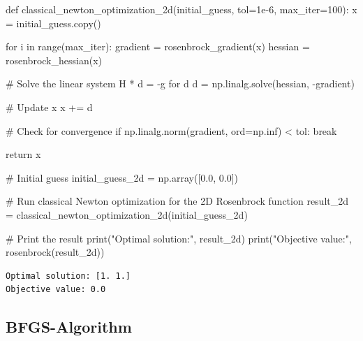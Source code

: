 \documentclass[
  letterpaper,
  DIV=11,
  numbers=noendperiod]{scrreprt}
\newenvironment{Shaded}{\begin{snugshade}}{\end{snugshade}}
\newcommand{\BuiltInTok}[1]{\textcolor[rgb]{0.00,0.23,0.31}{#1}}
\newcommand{\CommentTok}[1]{\textcolor[rgb]{0.37,0.37,0.37}{#1}}
\newcommand{\ControlFlowTok}[1]{\textcolor[rgb]{0.00,0.23,0.31}{#1}}
\newcommand{\DecValTok}[1]{\textcolor[rgb]{0.68,0.00,0.00}{#1}}
\newcommand{\FloatTok}[1]{\textcolor[rgb]{0.68,0.00,0.00}{#1}}
\newcommand{\KeywordTok}[1]{\textcolor[rgb]{0.00,0.23,0.31}{#1}}
\newcommand{\NormalTok}[1]{\textcolor[rgb]{0.00,0.23,0.31}{#1}}
\newcommand{\OperatorTok}[1]{\textcolor[rgb]{0.37,0.37,0.37}{#1}}
\newcommand{\StringTok}[1]{\textcolor[rgb]{0.13,0.47,0.30}{#1}}
\begin{document}
\begin{tcolorbox}
\begin{Shaded}
\begin{Highlighting}[]
\KeywordTok{def}\NormalTok{ classical\_newton\_optimization\_2d(initial\_guess, tol}\OperatorTok{=}\FloatTok{1e{-}6}\NormalTok{, max\_iter}\OperatorTok{=}\DecValTok{100}\NormalTok{):}
\NormalTok{    x }\OperatorTok{=}\NormalTok{ initial\_guess.copy()}

    \ControlFlowTok{for}\NormalTok{ i }\KeywordTok{in} \BuiltInTok{range}\NormalTok{(max\_iter):}
\NormalTok{        gradient }\OperatorTok{=}\NormalTok{ rosenbrock\_gradient(x)}
\NormalTok{        hessian }\OperatorTok{=}\NormalTok{ rosenbrock\_hessian(x)}

        \CommentTok{\# Solve the linear system H * d = {-}g for d}
\NormalTok{        d }\OperatorTok{=}\NormalTok{ np.linalg.solve(hessian, }\OperatorTok{{-}}\NormalTok{gradient)}

        \CommentTok{\# Update x}
\NormalTok{        x }\OperatorTok{+=}\NormalTok{ d}

        \CommentTok{\# Check for convergence}
        \ControlFlowTok{if}\NormalTok{ np.linalg.norm(gradient, }\BuiltInTok{ord}\OperatorTok{=}\NormalTok{np.inf) }\OperatorTok{\textless{}}\NormalTok{ tol:}
            \ControlFlowTok{break}

    \ControlFlowTok{return}\NormalTok{ x}

\CommentTok{\# Initial guess}
\NormalTok{initial\_guess\_2d }\OperatorTok{=}\NormalTok{ np.array([}\FloatTok{0.0}\NormalTok{, }\FloatTok{0.0}\NormalTok{])}

\CommentTok{\# Run classical Newton optimization for the 2D Rosenbrock function}
\NormalTok{result\_2d }\OperatorTok{=}\NormalTok{ classical\_newton\_optimization\_2d(initial\_guess\_2d)}

\CommentTok{\# Print the result}
\BuiltInTok{print}\NormalTok{(}\StringTok{"Optimal solution:"}\NormalTok{, result\_2d)}
\BuiltInTok{print}\NormalTok{(}\StringTok{"Objective value:"}\NormalTok{, rosenbrock(result\_2d))}
\end{Highlighting}
\end{Shaded}

\begin{verbatim}
Optimal solution: [1. 1.]
Objective value: 0.0
\end{verbatim}

\end{tcolorbox}

\subsection{BFGS-Algorithm}\label{bfgs-algorithm}
\end{document}
